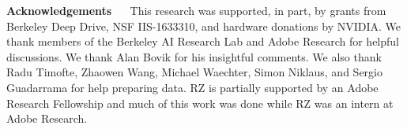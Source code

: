 \documentclass[10pt,twocolumn,letterpaper]{article}
\renewcommand{\paragraph}[1]{\vspace{5px} \noindent \textbf{#1} \ \ }
\begin{document}
\vspace{-1mm}
{\paragraph{Acknowledgements} This research was supported, in part, by grants from Berkeley Deep Drive, NSF IIS-1633310, and hardware donations by NVIDIA. We thank members of the Berkeley AI Research Lab and Adobe Research for helpful discussions. We thank Alan Bovik for his insightful comments. We also thank Radu Timofte, Zhaowen Wang, Michael Waechter, Simon Niklaus, and Sergio Guadarrama for help preparing data. RZ is partially supported by an Adobe Research Fellowship and much of this work was done while RZ was an intern at Adobe Research.}

{\small


}

\appendix




\end{document}
